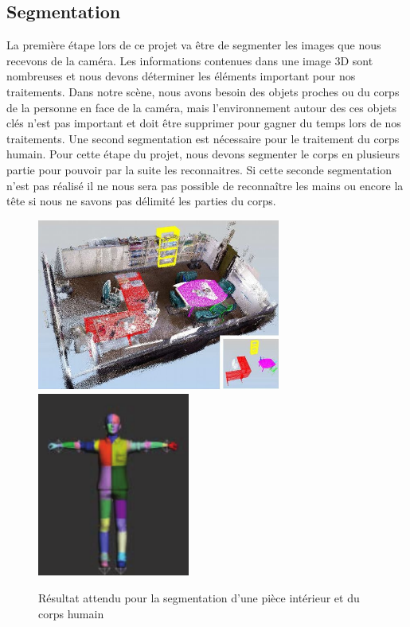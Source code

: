 \subsection{Segmentation}
La première étape lors de ce projet va être de segmenter les images que nous recevons de 
la caméra. Les informations contenues dans une image 3D sont nombreuses et nous devons
déterminer les éléments important pour nos traitements. Dans notre scène,
nous avons besoin des objets proches ou du corps de la personne en face de la caméra, mais 
l'environnement autour des ces objets clés n'est pas important et doit être supprimer pour
gagner du temps lors de nos traitements.
Une second segmentation est nécessaire pour le traitement du corps humain. Pour cette étape du projet,
nous devons segmenter le corps en plusieurs partie pour pouvoir par la suite les reconnaitres. Si cette
seconde segmentation n'est pas réalisé il ne nous sera pas possible de reconnaître les mains ou encore
la tête si nous ne savons pas délimité les parties du corps.  

\begin{figure}[!ht]
  \begin{center}
    \includegraphics[width=8cm]{image/segmentation.png}
    \includegraphics[width=5cm]{image/bodySegmentation.png}
    \caption{Résultat attendu pour la segmentation d'une pièce intérieur et du corps humain}
  \end{center}
\end{figure}
 
